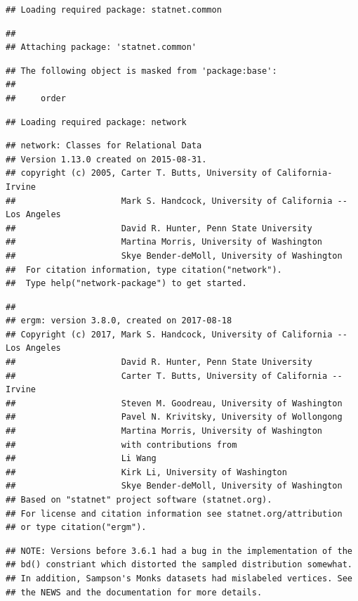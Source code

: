 \documentclass[]{book}
\theoremstyle{definition}
\theoremstyle{definition}
\theoremstyle{definition}
\theoremstyle{remark}
\begin{document}
\begin{verbatim}
## Loading required package: statnet.common
\end{verbatim}

\begin{verbatim}
## 
## Attaching package: 'statnet.common'
\end{verbatim}

\begin{verbatim}
## The following object is masked from 'package:base':
## 
##     order
\end{verbatim}

\begin{verbatim}
## Loading required package: network
\end{verbatim}

\begin{verbatim}
## network: Classes for Relational Data
## Version 1.13.0 created on 2015-08-31.
## copyright (c) 2005, Carter T. Butts, University of California-Irvine
##                     Mark S. Handcock, University of California -- Los Angeles
##                     David R. Hunter, Penn State University
##                     Martina Morris, University of Washington
##                     Skye Bender-deMoll, University of Washington
##  For citation information, type citation("network").
##  Type help("network-package") to get started.
\end{verbatim}

\begin{verbatim}
## 
## ergm: version 3.8.0, created on 2017-08-18
## Copyright (c) 2017, Mark S. Handcock, University of California -- Los Angeles
##                     David R. Hunter, Penn State University
##                     Carter T. Butts, University of California -- Irvine
##                     Steven M. Goodreau, University of Washington
##                     Pavel N. Krivitsky, University of Wollongong
##                     Martina Morris, University of Washington
##                     with contributions from
##                     Li Wang
##                     Kirk Li, University of Washington
##                     Skye Bender-deMoll, University of Washington
## Based on "statnet" project software (statnet.org).
## For license and citation information see statnet.org/attribution
## or type citation("ergm").
\end{verbatim}

\begin{verbatim}
## NOTE: Versions before 3.6.1 had a bug in the implementation of the
## bd() constriant which distorted the sampled distribution somewhat.
## In addition, Sampson's Monks datasets had mislabeled vertices. See
## the NEWS and the documentation for more details.
\end{verbatim}
\end{document}
